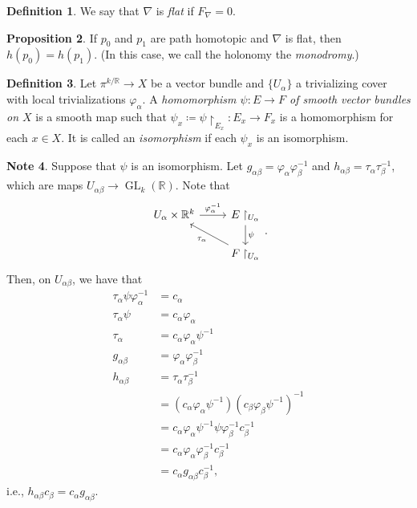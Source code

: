 \documentclass[10pt,letterpaper,cm]{nupset}
\theoremstyle{definition}
\newtheorem{definition}{Definition}[subsection]
\newtheorem{note}[definition]{Note}
\theoremstyle{theorem}
\newtheorem{prop}[definition]{Proposition}
\theoremstyle{remark}
\newcommand{\R}{\mathbb{R}}
\newcommand{\1}{\mathbb{1}}
\newcommand{\0}{\vec 0}
\DeclareMathOperator{\GL}{GL}
\begin{document}
\begin{definition}
We say that $\nabla$ is \textit{flat} if $F_{\nabla} =0$.
\end{definition}

\begin{prop}
If $p_0$ and $p_1$ are path homotopic and $\nabla$ is flat, then $h(p_0) = h(p_1)$. (In this case, we call the holonomy the \textit{monodromy}.)
\end{prop}

\begin{definition}
Let $\pi^{k/\R} \to X$ be a vector bundle and $\{U_{\alpha}\}$ a trivializing cover with local trivializations $\varphi_{\alpha}$. A \textit{homomorphism $\psi : E \to F$ of smooth vector bundles on $X$} is a smooth map such that $\psi_x \coloneqq \psi \restriction_{E_x} : E_x \to F_x$ is a homomorphism for each $x\in X$. It is called an \textit{isomorphism} if each $\psi_x$ is an isomorphism.  
\end{definition}

\begin{note}
Suppose that $\psi$ is an isomorphism.  Let $g_{\alpha{\beta}} = \varphi_{\alpha}\varphi^{-1}_{\beta}$ and $h_{\alpha{\beta}} = \tau_{\alpha}\tau_{\beta}^{-1}$, which are maps $U_{\alpha{\beta}} \to \GL_k(\R)$. Note that 
\[
\begin{tikzcd}
U_{\alpha}\times \R^k \arrow[r, "\varphi_{\alpha}^{-1}"] & E\restriction_{U_{\alpha}} \arrow[d, "\psi"]             \\
                                                         & F \restriction_{U_{\alpha}}  \arrow[lu, "\tau_{\alpha}"]
\end{tikzcd}
.\]
 Then, on $U_{\alpha{\beta}}$, we have that 
\begin{align*}
\tau_{\alpha}\psi \varphi_{\alpha}^{-1} & = c_{\alpha}
\\ \tau_{\alpha}\psi &= c_{\alpha}\varphi_{\alpha}
\\ \tau_{\alpha} & = c_{\alpha}\varphi_{\alpha} \psi^{-1}
\\ g_{\alpha{\beta}} & = \varphi_{\alpha} \varphi_{\beta}^{-1}
\\  h_{\alpha{\beta}} & = \tau_{\alpha}\tau_{\beta}^{-1}
\\ & = (c_{\alpha} \varphi_{\alpha}\psi^{-1})(c_{\beta}\varphi_{\beta}\psi^{-1})^{-1}
\\ & = c_{\alpha}\varphi_{\alpha}\psi^{-1}\psi \varphi_{\beta}^{-1} c_{\beta}^{-1}
\\ & = c_{\alpha}\varphi_{\alpha} \varphi_{\beta}^{-1}c_{\beta}^{-1}
\\ & = c_{\alpha}g_{\alpha{\beta}}c_{\beta}^{-1}\text{,}
\end{align*}
i.e., $h_{\alpha{\beta}}c_{\beta} = c_{\alpha}g_{\alpha{\beta}}$.
\end{note}
\end{document}

